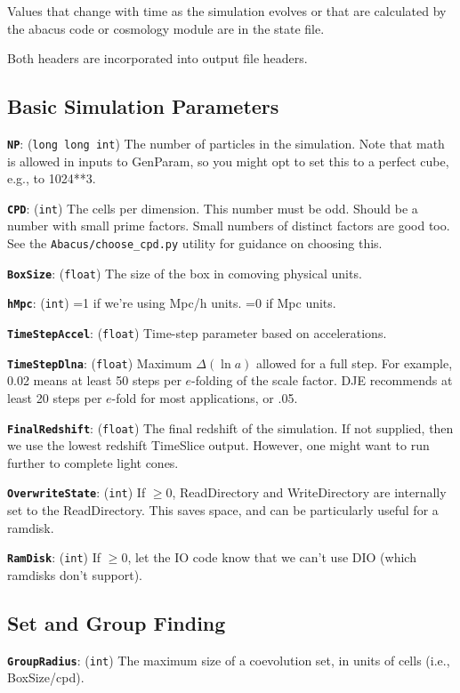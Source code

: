 \documentclass[11pt,preprint]{aastex}
\newcommand{\param}[2]{\medskip\noindent\textbf{\texttt{#1}}: ({\tt #2}) }
\newenvironment{private}{\comment}{\endcomment}
\newenvironment{private}
    {\textbf{Not public:}\\
    \begin{tabular}{|p{0.9\textwidth}|}
    \hline\\
    }
    {
    \\\\\hline
    \end{tabular}
    }
\begin{document}
Values that change with time as the simulation evolves or that are 
calculated by the abacus code or cosmology module are in the state
file.

Both headers are incorporated into output file headers. 

\subsection{Basic Simulation Parameters}

\param{NP}{long long int} The number of particles in the simulation.
Note that math is allowed in inputs to GenParam, so you might opt to
set this to a perfect cube, e.g., to 1024**3.

\param{CPD}{int} The cells per dimension.  This number must be odd.
Should be a number with small prime factors.  Small numbers of distinct factors are good too.
See the \texttt{Abacus/choose\_cpd.py} utility for guidance on choosing this.

\param{BoxSize}{float} The size of the box in comoving physical units.

\param{hMpc}{int} =1 if we're using Mpc/h units.  =0 if Mpc units.

\param{TimeStepAccel}{float} Time-step parameter based on accelerations.

\param{TimeStepDlna}{float} Maximum $\Delta(\ln a)$ allowed for a full step.
For example, 0.02 means at least 50 steps per $e$-folding of the scale factor.
DJE recommends at least 20 steps per $e$-fold for most applications, or .05.

\param{FinalRedshift}{float} The final redshift of the simulation.
If not supplied, then we use the lowest redshift TimeSlice output.
However, one might want to run further to complete light cones.

\param{OverwriteState}{int} If $\ge 0$, ReadDirectory and WriteDirectory are internally set to the ReadDirectory.
This saves space, and can be particularly useful for a ramdisk.

\param{RamDisk}{int} If $\ge 0$, let the IO code know that we can't use DIO (which ramdisks don't support).

\begin{private}
\subsection{Set and Group Finding}

\param{GroupRadius}{int} The maximum size of a coevolution set, 
in units of cells (i.e., BoxSize/cpd).
\end{private}
\end{document}
